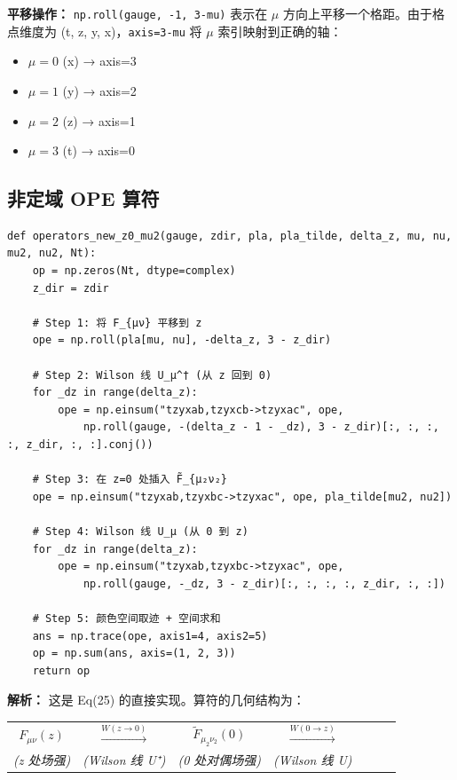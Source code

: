 \documentclass[12pt,a4paper]{ctexart}
\begin{document}
\textbf{平移操作：} \texttt{np.roll(gauge, -1, 3-mu)} 表示在 $\mu$ 方向上平移一个格距。由于格点维度为 (t, z, y, x)，\texttt{axis=3-mu} 将 $\mu$ 索引映射到正确的轴：
\begin{itemize}
    \item $\mu=0$ (x) → axis=3
    \item $\mu=1$ (y) → axis=2
    \item $\mu=2$ (z) → axis=1
    \item $\mu=3$ (t) → axis=0
\end{itemize}

\subsection{非定域 OPE 算符}

\begin{lstlisting}[caption={非定域 OPE 算符（含 Wilson 线）}]
def operators_new_z0_mu2(gauge, zdir, pla, pla_tilde, delta_z, mu, nu, mu2, nu2, Nt):
    op = np.zeros(Nt, dtype=complex)
    z_dir = zdir

    # Step 1: 将 F_{μν} 平移到 z
    ope = np.roll(pla[mu, nu], -delta_z, 3 - z_dir)

    # Step 2: Wilson 线 U_μ^† (从 z 回到 0)
    for _dz in range(delta_z):
        ope = np.einsum("tzyxab,tzyxcb->tzyxac", ope,
            np.roll(gauge, -(delta_z - 1 - _dz), 3 - z_dir)[:, :, :, :, z_dir, :, :].conj())

    # Step 3: 在 z=0 处插入 F̃_{μ₂ν₂}
    ope = np.einsum("tzyxab,tzyxbc->tzyxac", ope, pla_tilde[mu2, nu2])

    # Step 4: Wilson 线 U_μ (从 0 到 z)
    for _dz in range(delta_z):
        ope = np.einsum("tzyxab,tzyxbc->tzyxac", ope,
            np.roll(gauge, -_dz, 3 - z_dir)[:, :, :, :, z_dir, :, :])

    # Step 5: 颜色空间取迹 + 空间求和
    ans = np.trace(ope, axis1=4, axis2=5)
    op = np.sum(ans, axis=(1, 2, 3))
    return op
\end{lstlisting}

\textbf{解析：}
这是 Eq(25) 的直接实现。算符的几何结构为：

\begin{center}
\begin{tabular}{ccccccc}
$F_{\mu\nu}(z)$ & $\xrightarrow{W(z\to0)}$ & $\tilde{F}_{\mu_2\nu_2}(0)$ & $\xrightarrow{W(0\to z)}$ \\
\textit{(z 处场强)} & \textit{(Wilson 线 U⁺)} & \textit{(0 处对偶场强)} & \textit{(Wilson 线 U)}
\end{tabular}
\end{center}
\end{document}
